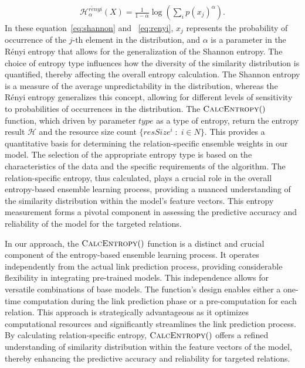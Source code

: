 \documentclass{article}
\begin{document}
\begin{align}
    \label{eq:renyi}    
    \mathcal{H}_{\alpha}^{r\acute{e}nyi}(X) = \frac{1}{1-\alpha} \log \left( \sum_{i} p(x_j)^\alpha \right).
\end{align}%
In these equation~\ref{eq:shannon} and ~\ref{eq:renyi}, $x_j$ represents the probability of occurrence of the $j$-th element in the distribution, and $\alpha$ is a parameter in the R\'enyi entropy that allows for the generalization of the Shannon entropy. The choice of entropy type influences how the diversity of the similarity distribution is quantified, thereby affecting the overall entropy calculation. The Shannon entropy is a measure of the average unpredictability in the distribution, whereas the R\'enyi entropy generalizes this concept, allowing for different levels of sensitivity to probabilities of occurrences in the distribution. The $\Call{CalcEntropy}$ function, which driven by parameter $type$ as a type of entropy, return the entropy result $\mathcal{H}$ and the resource size count $\{resSize^{i} \;:\; i \in N\}$. This provides a quantitative basis for determining the relation-specific ensemble weights in our model. The selection of the appropriate entropy type is based on the characteristics of the data and the specific requirements of the algorithm. The relation-specific entropy, thus calculated, plays a crucial role in the overall entropy-based ensemble learning process, providing a nuanced understanding of the similarity distribution within the model's feature vectors. This entropy measurement forms a pivotal component in assessing the predictive accuracy and reliability of the model for the targeted relations.

In our approach, the $\Call{CalcEntropy}$ function is a distinct and crucial component of the entropy-based ensemble learning process. It operates independently from the actual link prediction process, providing considerable flexibility in integrating pre-trained models. This independence allows for versatile combinations of base models. The function's design enables either a one-time computation during the link prediction phase or a pre-computation for each relation. This approach is strategically advantageous as it optimizes computational resources and significantly streamlines the link prediction process. By calculating relation-specific entropy, $\Call{CalcEntropy}$ offers a refined understanding of similarity distribution within the feature vectors of the model, thereby enhancing the predictive accuracy and reliability for targeted relations.
\\
\end{document}
